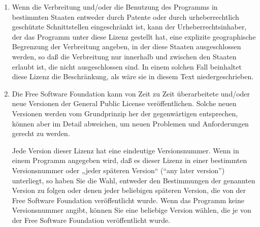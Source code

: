 {\begin{enumerate}
Sollte sich ein Teil dieses Paragraphen als ungültig oder unter bestimmten Umständen nicht durchsetzbar erweisen, so soll dieser Paragraph seinem Sinne nach angewandt werden; im übrigen soll dieser Paragraph als Ganzes gelten.

Zweck dieses Paragraphen ist nicht, Sie dazu zu bringen, irgendwelche Patente oder andere Eigentumsansprüche zu verletzen oder die Gültigkeit solcher Ansprüche zu bestreiten; dieser Paragraph hat einzig den Zweck, die Integrität des Verbreitungssystems der freien Software zu schützen, das durch die Praxis öffentlicher Lizenzen verwirklicht wird. Viele Leute haben großzügige Beiträge zu dem großen Angebot der mit diesem System verbreiteten Software im Vertrauen auf die konsistente Anwendung dieses Systems geleistet; es liegt am Autor/Geber, zu entscheiden, ob er die Software mittels irgendeines anderen Systems verbreiten will; ein Lizenznehmer hat auf diese Entscheidung keinen Einfluß.

Dieser Paragraph ist dazu gedacht, deutlich klarzustellen, was als Konsequenz aus dem Rest dieser Lizenz betrachtet wird.

\item Wenn die Verbreitung und/oder die Benutzung des Programms in bestimmten Staaten entweder durch Patente oder durch urheberrechtlich geschützte Schnittstellen eingeschränkt ist, kann der Urheberrechtsinhaber, der das Programm unter diese Lizenz gestellt hat, eine explizite geographische Begrenzung der Verbreitung angeben, in der diese Staaten ausgeschlossen werden, so daß die Verbreitung nur innerhalb und zwischen den Staaten erlaubt ist, die nicht ausgeschlossen sind. In einem solchen Fall beinhaltet diese Lizenz die Beschränkung, als wäre sie in diesem Text niedergeschrieben.

\item Die Free Software Foundation kann von Zeit zu Zeit überarbeitete und/oder neue Versionen der General Public License veröffentlichen. Solche neuen Versionen werden vom Grundprinzip her der gegenwärtigen entsprechen, können aber im Detail abweichen, um neuen Problemen und Anforderungen gerecht zu werden.

Jede Version dieser Lizenz hat eine eindeutige Versionsnummer. Wenn in einem Programm angegeben wird, daß es dieser Lizenz in einer bestimmten Versionsnummer oder „jeder späteren Version“ (“any later version”) unterliegt, so haben Sie die Wahl, entweder den Bestimmungen der genannten Version zu folgen oder denen jeder beliebigen späteren Version, die von der Free Software Foundation veröffentlicht wurde. Wenn das Programm keine Versionsnummer angibt, können Sie eine beliebige Version wählen, die je von der Free Software Foundation veröffentlicht wurde.


\end{enumerate}}
